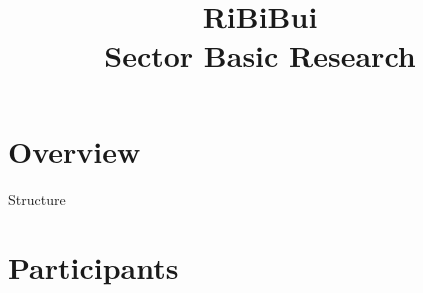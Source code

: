 \documentclass[xcolor=svgnames]{beamer}
\title
  [\hspace{30em}  RiBiBui - Feb 2017 Lugano]
  {RiBiBui \\ Sector Basic Research}
\newcommand{\1}{\'{\i}}
\begin{document}
\maketitle

%
%

\section*{Overview}
\begin{frame}{Structure}
\tableofcontents
\end{frame}

%
%
%
%

\section{Participants}
\end{document}
